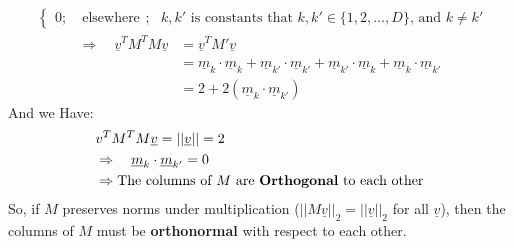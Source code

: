 \documentclass[11pt,letterpaper]{article}
\begin{document}
\begin{enumerate}
\begin{flushleft}
\begin{align*}
\begin{cases}
            0; \quad \text{elsewhere}
        \end{cases}; \text{ $k,k'$ is constants that }k,k'\in \{1,2,\dots,D\}
        \text{, and $k\not=k'$}
    \end{align*}
    \begin{align*}
        \Rightarrow \quad \underline v^T M^T M \underline v &= 
        \underline v^T M' \underline v \\
        &= \underline m_k \cdot \underline m_k + \underline m_{k'} \cdot \underline m_{k'} 
        + \underline m_{k'} \cdot \underline m_k + \underline m_k \cdot \underline m_{k'}
        \\
        &= 2 + 2(\underline m_k \cdot \underline m_{k'})
    \end{align*}
    And we Have:
     \begin{align*}
          &v^T M^T M \underline v = ||\underline v|| = 2
          \\
          &\Rightarrow \quad \underline m_k \cdot \underline m_{k'} = 0
          \\
          &\Rightarrow \text{The columns of $M$ are \textbf{Orthogonal} to each other}
    \end{align*}
    So, if $M$ preserves norms under multiplication ($||M \underline v||_2 = ||\underline v||_2$ for all $\underline v$), then the columns of $M$ must be \textbf{orthonormal} with respect to each other.
\end{flushleft}
\newpage


\end{enumerate}
\end{document}
